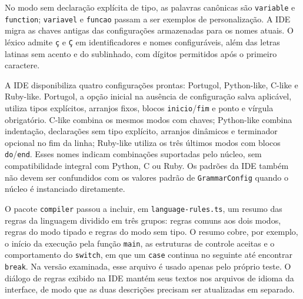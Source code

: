 No modo sem declaração explícita de tipo, as palavras canônicas são \texttt{variable} e \texttt{function}; \texttt{variavel} e \texttt{funcao} passam a ser exemplos de personalização. A IDE migra as chaves antigas das configurações armazenadas para os nomes atuais. O léxico admite \texttt{ç} e \texttt{Ç} em identificadores e nomes configuráveis, além das letras latinas sem acento e do sublinhado, com dígitos permitidos após o primeiro caractere.

A IDE disponibiliza quatro configurações prontas: Portugol, Python-like, C-like e Ruby-like. Portugol, a opção inicial na ausência de configuração salva aplicável, utiliza tipos explícitos, arranjos fixos, blocos \texttt{inicio}/\texttt{fim} e ponto e vírgula obrigatório. C-like combina os mesmos modos com chaves; Python-like combina indentação, declarações sem tipo explícito, arranjos dinâmicos e terminador opcional no fim da linha; Ruby-like utiliza os três últimos modos com blocos \texttt{do}/\texttt{end}. Esses nomes indicam combinações suportadas pelo núcleo, sem compatibilidade integral com Python, C ou Ruby. Os padrões da IDE também não devem ser confundidos com os valores padrão de \texttt{GrammarConfig} quando o núcleo é instanciado diretamente.

O pacote \texttt{compiler} passou a incluir, em \texttt{language-rules.ts}, um resumo das regras da linguagem dividido em três grupos: regras comuns aos dois modos, regras do modo tipado e regras do modo sem tipo. O resumo cobre, por exemplo, o início da execução pela função \texttt{main}, as estruturas de controle aceitas e o comportamento do \texttt{switch}, em que um \texttt{case} continua no seguinte até encontrar \texttt{break}. Na versão examinada, esse arquivo é usado apenas pelo próprio teste. O diálogo de regras exibido na IDE mantém seus textos nos arquivos de idioma da interface, de modo que as duas descrições precisam ser atualizadas em separado.

